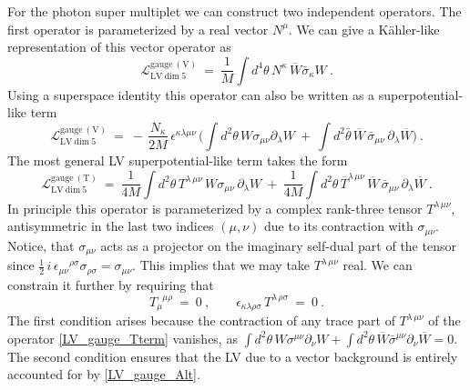 \documentclass[12pt]{revtex4}
\begin{document}
For the photon super multiplet we can construct two independent
operators. The first operator is parameterized by a real vector
$N^\mu$. We can give a K\"ahler-like representation of this vector
operator as  
\begin{equation}
\label{LV_gauge}
\mathcal{L}_{\mathrm{LV\ dim\ 5}}^{\mathrm{gauge\ (V)}} ~=~ 
\frac 1M \int d^4\theta \, 
N^\kappa\, \overline{W} \bar{\sigma}_\kappa W~.   
\end{equation}
%
Using a superspace identity this operator can also be written as a
superpotential-like term  
%
\begin{equation}
\label{LV_gauge_Alt}
\mathcal{L}_{\mathrm{LV\ dim\ 5}}^{\mathrm{gauge\ (V)}} ~=~ 
- \, \frac {N_\kappa}{2 M}\,  \epsilon^{\kappa\lambda\mu\nu} \,  
\Big( 
\int d^2\theta\, W \sigma_{\mu\nu} \partial_\lambda W ~+~
\int d^2\bar{\theta}\, \overline{W} \, \bar{\sigma}_{\mu\nu}\, 
\partial_\lambda \overline{W} 
\Big)~.
\end{equation} 
%
The most general LV superpotential-like term takes the form 
\begin{equation}
\label{LV_gauge_Tterm}
\mathcal{L}_{\mathrm{LV\ dim\ 5}}^{\mathrm{gauge\ (T)}} ~=~ 
\frac 1{4M} 
\int d^2\theta \, T^{\lambda\, \mu\nu} \,
        W \sigma_{\mu\nu} \, \partial_\lambda W  
~+~ \frac 1{4M} 
\int d^2\theta \, \overline{T}^{\lambda\, \mu\nu} \,
        \overline{W} \,\bar{\sigma}_{\mu\nu}\, \partial_\lambda\overline{W}  
~.
\end{equation}
%
In principle this operator is parameterized by a complex rank-three
tensor $T^{\lambda\,\mu\nu}$, antisymmetric in the last two indices
$(\mu,\nu)$ due to its contraction with $\sigma_{\mu\nu}$. Notice, that
$\sigma_{\mu\nu}$ acts as a projector on the imaginary self-dual part
of the tensor since 
\(
\frac{1}{2}\,i\,\epsilon_{\mu\nu}{}^{\rho\sigma}
\sigma_{\rho\sigma} = \sigma_{\mu\nu}. 
\)
This implies that we may take $T^{\lambda\,\mu\nu}$ real. We can
constrain it further by requiring that 
%
\begin{equation}
T_\mu^{\phantom{\mu}\mu\rho} ~=~ 0~,
 \qquad 
\epsilon_{\kappa\lambda\rho\sigma}\, T^{\lambda\,\rho\sigma}  ~=~  0~.
\end{equation} 
%
The first condition arises because the contraction of any trace part of
$T^{\lambda\,\mu\nu}$ of the operator \eqref{LV_gauge_Tterm} vanishes, as
\(
\int d^2\theta \, W\sigma^{\mu\nu} \partial_\nu W + 
\int d^2\theta \, \overline{W} \bar\sigma^{\mu\nu} \partial_\nu
\overline{W} = 0. 
\)
The second condition ensures that the LV due to a vector 
background is entirely accounted for by \eqref{LV_gauge_Alt}.
\end{document}

